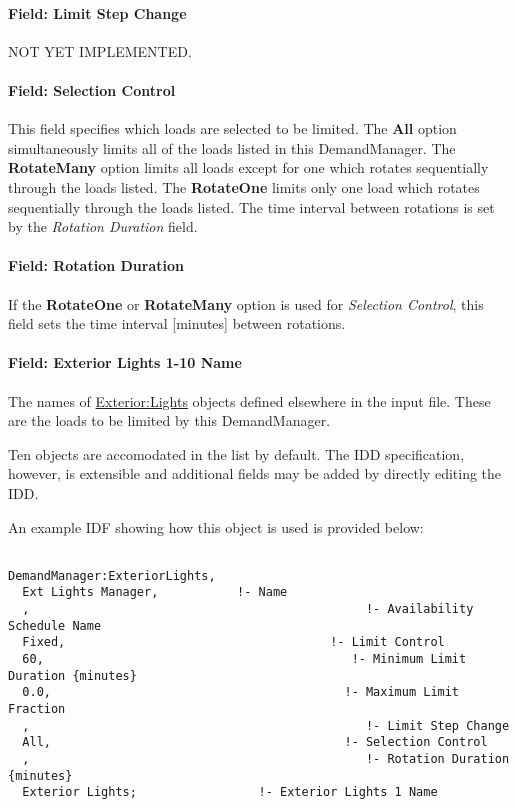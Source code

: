 \paragraph{Field: Limit Step Change}\label{field-limit-step-change}

NOT YET IMPLEMENTED.

\paragraph{Field: Selection Control}\label{field-selection-control}

This field specifies which loads are selected to be limited. The \textbf{All} option simultaneously limits all of the loads listed in this DemandManager. The \textbf{RotateMany} option limits all loads except for one which rotates sequentially through the loads listed. The \textbf{RotateOne} limits only one load which rotates sequentially through the loads listed. The time interval between rotations is set by the \emph{Rotation Duration} field.

\paragraph{Field: Rotation Duration}\label{field-rotation-duration}

If the \textbf{RotateOne} or \textbf{RotateMany} option is used for \emph{Selection Control}, this field sets the time interval {[}minutes{]} between rotations.

\paragraph{Field: Exterior Lights 1-10 Name}\label{field-exterior-lights-1-10-name}

The names of \hyperref[exteriorlights]{Exterior:Lights} objects defined elsewhere in the input file. These are the loads to be limited by this DemandManager.

Ten objects are accomodated in the list by default. The IDD specification, however, is extensible and additional fields may be added by directly editing the IDD.

An example IDF showing how this object is used is provided below:

\begin{lstlisting}

DemandManager:ExteriorLights,
  Ext Lights Manager,           !- Name
  ,                                               !- Availability Schedule Name
  Fixed,                                     !- Limit Control
  60,                                           !- Minimum Limit Duration {minutes}
  0.0,                                         !- Maximum Limit Fraction
  ,                                               !- Limit Step Change
  All,                                         !- Selection Control
  ,                                               !- Rotation Duration {minutes}
  Exterior Lights;                 !- Exterior Lights 1 Name
\end{lstlisting}

